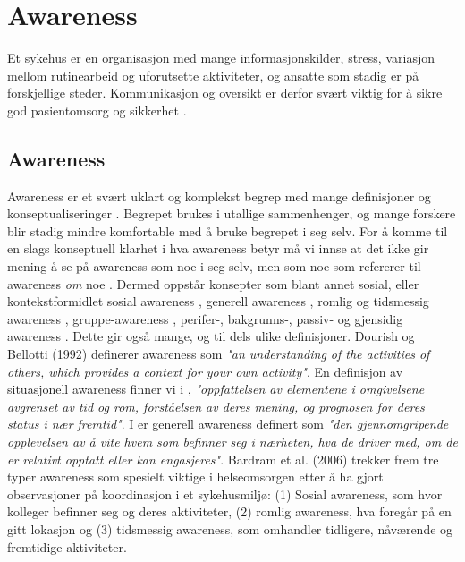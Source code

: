 \section{Awareness}
\label{chp: awareness}

Et sykehus er en organisasjon med mange informasjonskilder, stress, variasjon mellom rutinearbeid og uforutsette aktiviteter, og ansatte som stadig er på forskjellige steder. Kommunikasjon og oversikt er derfor svært viktig for å sikre god pasientomsorg og sikkerhet \cite{Klemets12}.

\subsection{Awareness}
Awareness er et svært uklart og komplekst begrep med mange definisjoner og konseptualiseringer \cite{KlemetsRedundancy, Gutwin04, Schmidt02}. Begrepet brukes i utallige sammenhenger, og mange forskere blir stadig mindre komfortable med å bruke begrepet i seg selv. For å komme til en slags konseptuell klarhet i hva awareness betyr må vi innse at det ikke gir mening å se på awareness som noe i seg selv, men som noe som refererer til awareness \emph{om} noe \cite{Schmidt02}. Dermed oppstår konsepter som blant annet sosial, eller kontekstformidlet sosial awareness \cite{Bardram04}, generell awareness \cite{Gross13}, romlig og tidsmessig awareness \cite{Randell}, gruppe-awareness \cite{Gutwin04}, perifer-, bakgrunns-, passiv- og gjensidig awareness \cite{Schmidt02}. Dette gir også mange, og til dels ulike definisjoner. Dourish og Bellotti (1992)\nocite{Dourish92} definerer awareness som \emph{"an understanding of the activities of others, which provides a context for your own activity"}. En definisjon av situasjonell awareness finner vi i \cite{Endsly95}, \emph{"oppfattelsen av elementene i omgivelsene avgrenset av tid og rom, forståelsen av deres mening, og prognosen for deres status i nær fremtid"}. I \cite{Gross13} er generell awareness definert som \emph{"den gjennomgripende opplevelsen av å vite hvem som befinner seg i nærheten, hva de driver med, om de er relativt opptatt eller kan engasjeres"}. Bardram et al. (2006) trekker frem tre typer awareness som spesielt viktige i helseomsorgen etter å ha gjort observasjoner på koordinasjon i et sykehusmiljø: (1) Sosial awareness, som hvor kolleger befinner seg og deres aktiviteter, (2) romlig awareness, hva foregår på en gitt lokasjon og (3) tidsmessig awareness, som omhandler tidligere, nåværende og fremtidige aktiviteter.

